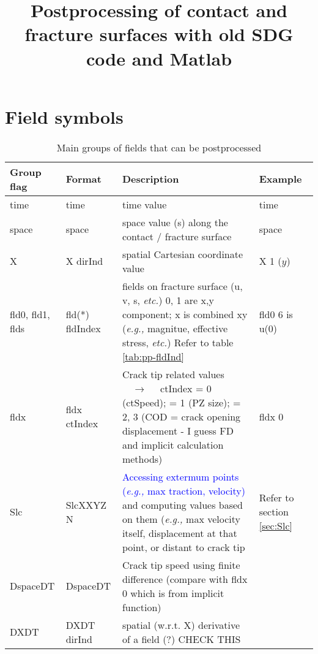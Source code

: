 \documentclass[10pt]{article}
\makeatletter
\def\eg{\textit{e.g.,}\xspace}
\def\etc{\textit{etc.}\@\xspace}
\makeatother
\begin{document}
\title{Postprocessing of contact and fracture surfaces with old SDG code and Matlab}




\section{Field symbols}


\begin{table}[t]
\label{tab:pp-mainGroups}
\caption{Main groups of fields that can be postprocessed}
%
\newlength{\colmA}
\setlength{\colmA}{2.0cm}
\newlength{\colmB}
\setlength{\colmB}{2.6cm}
\newlength{\colmC}
\setlength{\colmC}{8.5cm}
\newlength{\colmD}
\setlength{\colmD}{2.5cm}
%
\begin{center}
\begin{tabular}{ | p{\colmA} | p{\colmB} | p{\colmC} | p{\colmD} | }
\hline 
Group flag & Format & Description & Example \\
\hline 
time & time & time value & time \\
\hline 
space & space & space value (s) along the contact / fracture surface& space\\
\hline
X	& X dirInd & spatial Cartesian coordinate	value & X 1 ($y$) \\
fld0, fld1, flds &	fld(*) fldIndex	 & fields on fracture surface (u, v, s, \etc) 0, 1 are x,y component; x is combined xy (\eg magnitue, effective stress, \etc) Refer to table \ref{tab:pp-fldInd} & fld0	6 is u(0) \\
\hline 
fldx	&	fldx	ctIndex	& Crack tip related values $\quad \rightarrow \quad $ ctIndex = 0 (ctSpeed); = 1 (PZ size); = 2, 3 (COD = crack opening displacement - I guess FD and implicit calculation methods) & fldx 0 	\\
\hline 
Slc & SlcXXYZ	N & \textcolor{blue}{Accessing extermum points (\eg max traction, velocity)} and computing values based on them (\eg max velocity itself, displacement at that point, or distant to crack tip & Refer to section \ref{sec:Slc} \\
\hline 
DspaceDT & DspaceDT & Crack tip speed using finite difference (compare with fldx 0 which is from implicit function) & \\ 
\hline 
DXDT & DXDT dirInd & spatial (w.r.t. X) derivative of a field (?) CHECK THIS & \\ 

\end{tabular}
\end{center}
\end{table}
\end{document}
